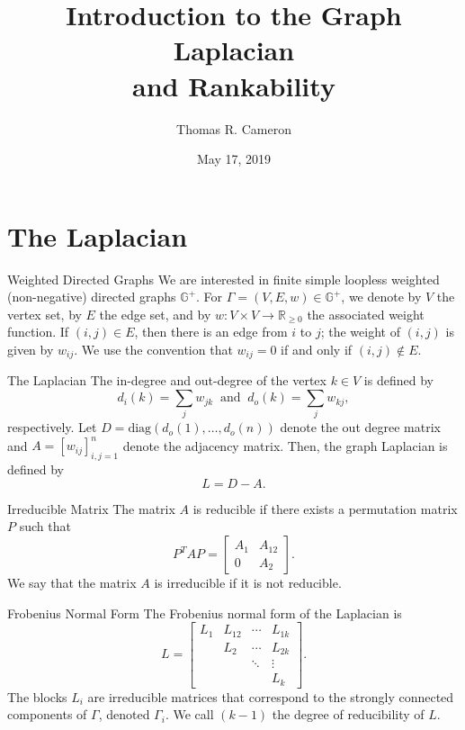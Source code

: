 \documentclass{beamer}
\title{Introduction to the Graph Laplacian \\ and Rankability}
\author{Thomas R. Cameron}
\institute{Davidson College}
\date{May 17, 2019}
\newcommand\diag[1]{\textrm{diag}\left(#1\right)}
\begin{document}
\begin{frame}
	\titlepage
\end{frame}


\section{The Laplacian}

\begin{frame}{Weighted Directed Graphs}
We are interested in finite simple loopless weighted (non-negative) directed graphs $\mathbb{G}^{+}$.
\vfill
For $\Gamma=(V,E,w)\in\mathbb{G}^{+}$, we denote by $V$ the vertex set, by $E$ the edge set, and by $w\colon V\times V\rightarrow\mathbb{R}_{\geq 0}$ the associated weight function.
\vfill
If $(i,j)\in E$, then there is an edge from $i$ to $j$;
the weight of $(i,j)$ is given by $w_{ij}$.
\vfill
We use the convention that $w_{ij}=0$ if and only if $(i,j)\notin E$.
\end{frame}

\begin{frame}{The Laplacian}
The in-degree and out-degree of the vertex $k\in V$ is defined by
\[
d_{i}(k)=\sum_{j}w_{jk}~\text{ and }~d_{o}(k)=\sum_{j}w_{kj},
\]
respectively.
\vfill
Let $D=\diag{d_{o}(1),\ldots,d_{o}(n)}$ denote the out degree matrix and $A=[w_{ij}]_{i,j=1}^{n}$ denote the adjacency matrix.
\vfill
Then, the graph Laplacian is defined by
\[
L=D-A.
\]
\end{frame}

\begin{frame}{Irreducible Matrix}
The matrix $A$ is reducible if there exists a permutation matrix $P$ such that
\[
P^{T}AP = \begin{bmatrix} A_{1} & A_{12} \\ 0 & A_{2}\end{bmatrix}.
\]
\vfill
We say that the matrix $A$ is irreducible if it is not reducible. 
\end{frame}

\begin{frame}{Frobenius Normal Form}
The Frobenius normal form of the Laplacian is
\[
L = \begin{bmatrix} L_{1} & L_{12} & \cdots & L_{1k} \\
				& L_{2} & \cdots & L_{2k} \\
				& & \ddots & \vdots \\
				& & & L_{k} \end{bmatrix}.
\]
\vfill
The blocks $L_{i}$ are irreducible matrices that correspond to the strongly connected components of $\Gamma$, denoted $\Gamma_{i}$.
\vfill
We call $(k-1)$ the degree of reducibility of $L$.
\end{frame}
\end{document}

